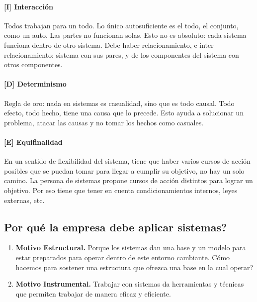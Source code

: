 \hypertarget{interaccion}{%
\paragraph{%
{[}I{]}
Interacción}\label{interaccion}}
Todos trabajan para un todo. Lo único autosuficiente es el todo, el conjunto, como un auto. Las partes no funcionan solas. Esto no es absoluto: cada sistema funciona dentro de otro sistema. Debe haber relacionamiento, e inter relacionamiento: sistema con sus pares, y de los componentes del sistema con otros componentes.

\hypertarget{determinismo}{%
\paragraph{%
{[}D{]}
Determinismo}\label{determinismo}}
Regla de oro: nada en sistemas es casualidad, sino que es todo causal. Todo efecto, todo hecho, tiene una causa que lo precede. Esto ayuda a solucionar un problema, atacar las causas y no tomar los hechos como casuales.

\hypertarget{equifinalidad}{%
\paragraph{%
{[}E{]}
Equifinalidad}\label{equifinalidad}}
En un sentido de flexibilidad del sistema, tiene que haber varios cursos de acción posibles que se puedan tomar para llegar a cumplir su objetivo, no hay un solo camino. La persona de sistemas propone cursos de acción distintos para lograr un objetivo. Por eso tiene que tener en cuenta condicionamientos internos, leyes externas, etc.

\hypertarget{por-quuxe9-la-empresa-debe-aplicar-sistemas}{%
\subsection*{Por qué la empresa debe aplicar
sistemas?}\label{por-quuxe9-la-empresa-debe-aplicar-sistemas}}

\begin{enumerate}
\def\labelenumi{\arabic{enumi}.}
\item
  \textbf{Motivo Estructural.} Porque los sistemas dan una base y un modelo para
  estar preparados para operar dentro de este entorno cambiante. Cómo
  hacemos para sostener una estructura que ofrezca una base en la cual
  operar?
\item
  \textbf{Motivo Instrumental.} Trabajar con sistemas da herramientas y técnicas
  que permiten trabajar de manera eficaz y eficiente.
\end{enumerate}

